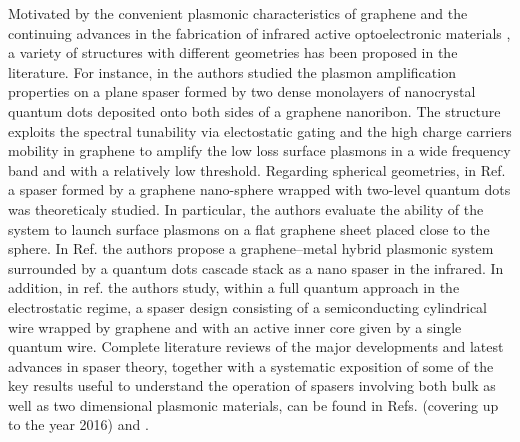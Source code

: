 \documentclass[9pt,twocolumn,twoside]{osajnl}
\begin{document}
%
%
Motivated by the convenient plasmonic characteristics of graphene and the continuing advances in the fabrication of infrared active optoelectronic materials \cite{infrared1}, a variety of structures with different geometries has been proposed in the literature. For instance, in \cite{spasergraf0} the authors studied the plasmon amplification properties on a plane spaser formed by two dense monolayers of nanocrystal quantum dots deposited onto both sides of a graphene nanoribon. The structure exploits  the spectral tunability via electostatic gating and the high charge carriers mobility in graphene to amplify the low loss surface plasmons in a wide frequency band and with a relatively low threshold.
Regarding spherical geometries, in Ref. \cite{spasergraf2} a spaser formed by a graphene nano-sphere wrapped with two-level quantum dots was theoreticaly studied. In particular, the authors evaluate the ability of the system to launch surface plasmons on a flat graphene sheet placed close to the sphere. 
In Ref. \cite{spasergraf3} the authors propose a %
%
graphene--metal %
hybrid plasmonic system surrounded by a quantum dots cascade stack as a nano spaser in the infrared. 
%
In addition, in ref. \cite{ardakani2020} the authors study, within a full quantum approach in the electrostatic regime, a spaser design consisting of a semiconducting cylindrical wire wrapped by graphene and with an active inner core given by a single quantum wire.
Complete literature reviews of the major developments and latest advances in spaser theory, together with a systematic exposition of some of the key results useful to understand the operation of spasers involving both bulk as well as two dimensional plasmonic materials, can be found in Refs. \cite{spasergraf1} (covering up to the year 2016) and \cite{Rev3}. 



\end{document}
